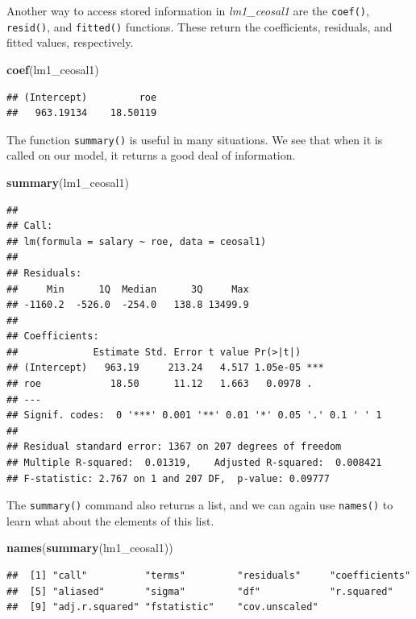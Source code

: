 \documentclass[]{book}
\newenvironment{Shaded}{\begin{snugshade}}{\end{snugshade}}
\newcommand{\KeywordTok}[1]{\textcolor[rgb]{0.13,0.29,0.53}{\textbf{#1}}}
\newcommand{\NormalTok}[1]{#1}
\begin{document}
Another way to access stored information in \emph{lm1\_ceosal1} are the \texttt{coef()}, \texttt{resid()}, and \texttt{fitted()} functions. These return the coefficients, residuals, and fitted values, respectively.

\begin{Shaded}
\begin{Highlighting}[]
\KeywordTok{coef}\NormalTok{(lm1_ceosal1)}
\end{Highlighting}
\end{Shaded}

\begin{verbatim}
## (Intercept)         roe 
##   963.19134    18.50119
\end{verbatim}

The function \texttt{summary()} is useful in many situations. We see that when it is called on our model, it returns a good deal of information.

\begin{Shaded}
\begin{Highlighting}[]
\KeywordTok{summary}\NormalTok{(lm1_ceosal1)}
\end{Highlighting}
\end{Shaded}

\begin{verbatim}
## 
## Call:
## lm(formula = salary ~ roe, data = ceosal1)
## 
## Residuals:
##     Min      1Q  Median      3Q     Max 
## -1160.2  -526.0  -254.0   138.8 13499.9 
## 
## Coefficients:
##             Estimate Std. Error t value Pr(>|t|)    
## (Intercept)   963.19     213.24   4.517 1.05e-05 ***
## roe            18.50      11.12   1.663   0.0978 .  
## ---
## Signif. codes:  0 '***' 0.001 '**' 0.01 '*' 0.05 '.' 0.1 ' ' 1
## 
## Residual standard error: 1367 on 207 degrees of freedom
## Multiple R-squared:  0.01319,    Adjusted R-squared:  0.008421 
## F-statistic: 2.767 on 1 and 207 DF,  p-value: 0.09777
\end{verbatim}

The \texttt{summary()} command also returns a list, and we can again use \texttt{names()} to learn what about the elements of this list.

\begin{Shaded}
\begin{Highlighting}[]
\KeywordTok{names}\NormalTok{(}\KeywordTok{summary}\NormalTok{(lm1_ceosal1))}
\end{Highlighting}
\end{Shaded}

\begin{verbatim}
##  [1] "call"          "terms"         "residuals"     "coefficients" 
##  [5] "aliased"       "sigma"         "df"            "r.squared"    
##  [9] "adj.r.squared" "fstatistic"    "cov.unscaled"
\end{verbatim}
\end{document}
